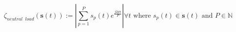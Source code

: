 \begin{equation}
	\zeta_{neutral\;\;load}(\textbf{s}(t)) := \left|\sum_{p=1}^{P} s_p(t)e^{\frac{j2p\pi}{P}}\right| \forall t \text{ where } s_p(t) \in \textbf{s}(t) \text{ and } P \in \mathbb{N}
\label{ch1:equ:neutral-load}
\end{equation}